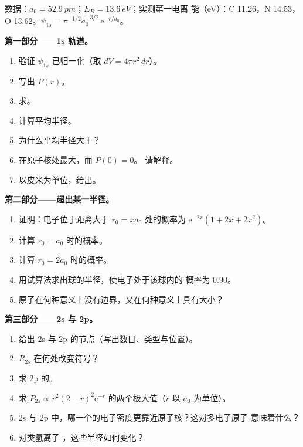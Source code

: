 \begin{problem}
\label{pb:b2:atomic-orbitals:1}
数据：$a_0 = \qty{52.9}{pm}$；$E_R = \qty{13.6}{eV}$；实测第一电离
能（\unit{eV}）：C 11.26，N 14.53，O 13.62。$\psi_{1s} = \pi^{-1/2}a_0^{-3/2}\,
\mathrm e^{-r/a_0}$。

\medskip
\noindent\textbf{第一部分——1s 轨道。}
\begin{enumerate}
  \item 验证 $\psi_{1s}$ 已归一化（取 $dV = 4\pi r^2\,dr$）。
  \item 写出 $P(r)$。
  \item 求。
  \item 计算平均半径。
  \item 为什么平均半径大于？
  \item {}在原子核处最大，而 $P(0) = 0$。
        请解释。
  \item 以皮米为单位，给出。
\end{enumerate}

\medskip
\noindent\textbf{第二部分——超出某一半径。}
\begin{enumerate}[resume]
  \item 证明：电子位于距离大于 $r_0 =
        xa_0$ 处的概率为 $\mathrm e^{-2x}(1 + 2x + 2x^2)$。
  \item 计算 $r_0 = a_0$ 时的概率。
  \item 计算 $r_0 = 2a_0$ 时的概率。
  \item 用试算法求出球的半径，使电子处于该球内的
        概率为 0.90。
  \item 原子在何种意义上没有边界，又在何种意义上具有大小？
\end{enumerate}

\medskip
\noindent\textbf{第三部分——2s 与 2p。}
\begin{enumerate}[resume]
  \item 给出 2s 与 2p 的节点（写出数目、类型与位置）。
  \item $R_{2s}$ 在何处改变符号？
  \item 求 2p 的。
  \item 求 $P_{2s} \propto r^2(2 - r)^2\mathrm e^{-r}$ 的两个极大值（$r$ 以
        $a_0$ 为单位）。
  \item 2s 与 2p 中，哪一个的电子密度更靠近原子核？这对多电子原子
        意味着什么？
  \item 对类氢离子 ，这些半径如何变化？
\end{enumerate}


\end{problem}
